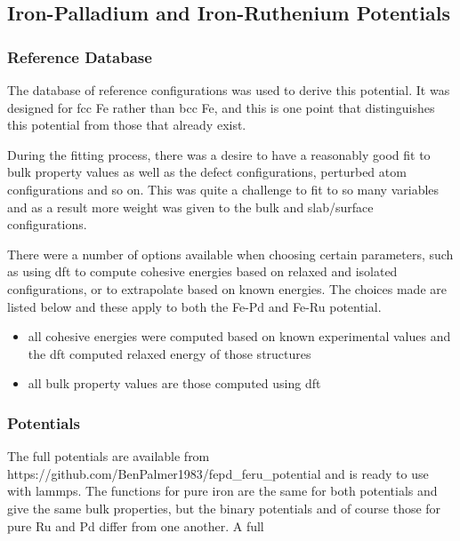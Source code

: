 \FloatBarrier
\subsection{Iron-Palladium and Iron-Ruthenium Potentials}
\label{section:fepdpotentialresult}

\subsubsection{Reference Database}

The database of reference configurations was used to derive this potential.  It was designed for \acrshort{fcc} Fe rather than \acrshort{bcc} Fe, and this is one point that distinguishes this potential from those that already exist.

During the fitting process, there was a desire to have a reasonably good fit to bulk property values as well as the defect configurations, perturbed atom configurations and so on.  This was quite a challenge to fit to so many variables and as a result more weight was given to the bulk and slab/surface configurations.

There were a number of options available when choosing certain parameters, such as using \acrshort{dft} to compute cohesive energies based on relaxed and isolated configurations, or to extrapolate based on known energies.  The choices made are listed below and these apply to both the Fe-Pd and Fe-Ru potential.

\begin{itemize}
\item all cohesive energies were computed based on known experimental values and the \acrshort{dft} computed relaxed energy of those structures
\item all bulk property values are those computed using \acrshort{dft}
\end{itemize}
 
\FloatBarrier
\subsubsection{Potentials}

The full potentials are available from https://github.com/BenPalmer1983/fepd\_feru\_potential and is ready to use with \acrshort{lammps}.  The functions for pure iron are the same for both potentials and give the same bulk properties, but the binary potentials and of course those for pure Ru and Pd differ from one another.  A full 

